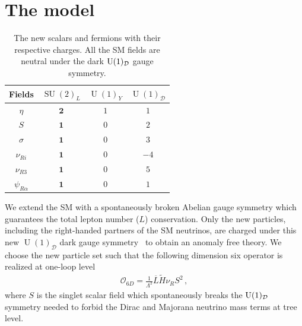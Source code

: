 \documentclass[12pt]{article}
\begin{document}
\section{The model}
\label{sec:Model}
%
\begin{table}[t!]
  \centering
  \begin{tabular}{|c|c|c|c|}
    \hline  
    Fields     & $\operatorname{SU}(2)_L$ & $\operatorname{U}(1)_Y $ & $\operatorname{U}(1)_{\mathcal{D}}$ \\ \hline
    $\eta$  & $\boldsymbol{2}$ & $1$  & $1$ \\
    $S$ & $\boldsymbol{1}$ & $0$  & $2$ \\
    $\sigma$ & $\boldsymbol{1}$ & $0$ & $3$ \\
    \hline
    $\nu_{Ri}$ & $\boldsymbol{1}$ & $0$ & $-4$\\
    $\nu_{R3}$ & $\boldsymbol{1}$ & $0$ & $5$\\
    $\psi_{R\alpha}$  & $\boldsymbol{1}$ & 0 & $1$ \\\hline
  \end{tabular}
  \caption{The new scalars and fermions with their respective charges. All the SM fields are neutral under the dark $\operatorname{U}(1)_{\cal {D}}$ gauge symmetry. }
    \label{tab:partcont}
\end{table}
%
We extend the SM with a spontaneously broken Abelian gauge
symmetry which guarantees the total lepton number ($L$)
conservation. Only the new particles, including the  right-handed partners of the SM
neutrinos, are charged under this new
$\operatorname{U}(1)_{\mathcal{D}}$ dark gauge
symmetry~\cite{Campos:2017dgc,Bertuzzo:2018itn,Bertuzzo:2018ftf} to obtain an anomaly free theory. We
choose the new particle set such that the following dimension six
operator is realized at one-loop level
\begin{align}
  \label{eq:ld6}
  \mathcal{O}_{6D}=\frac{1}{\Lambda^2} \overline{L} \tilde{H} \nu_R S^2\,,
\end{align}
where $S$ is the singlet scalar field which spontaneously breaks the $\operatorname{U}(1)_{\cal {D}}$ symmetry needed to forbid the Dirac and Majorana neutrino mass terms at tree level.
\end{document}
